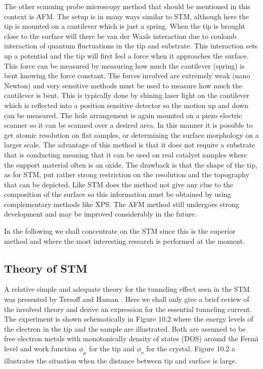 The other scanning probe microscopy method that should be mentioned in this context is AFM. The setup is in many ways similar to STM, although here the tip is mounted on a cantilever which is just a spring. When the tip is brought close to the surface will there be  van der Waals interaction due to coulomb interaction of quantum fluctuations in the tip and substrate. This interaction sets up a potential and the tip will first feel a force when it approaches the surface. This force can be measured by measuring how much the cantilever (spring) is bent knowing the force constant.  The forces involved are extremely weak (nano Newton) and very sensitive methods must be used to measure how much the cantilever is bent. This is typically done by shining laser light on the cantilever which is reflected into a position sensitive detector so the motion up and down can be measured. The hole arrangement is again mounted on a piezo electric scanner so it can be scanned over a desired area. In this manner it is possible to get atomic resolution on flat samples, or determining the  surface morphology on a larger scale. The advantage of this method is that it does not require a substrate that is conducting meaning that it can be used on real catalyst samples where the support material often is an oxide. The drawback is  that the shape of the tip, as for STM,  put rather strong restriction on the resolution  and the topography that can be depicted. Like STM  does the method not give any clue to the composition of the surface so this information must be obtained by using complementary methods like XPS. The AFM method still undergoes strong development and may be improved considerably  in the future.

In the following we shall concentrate on the STM since this is the superior method and where the most interesting research is performed at the moment.


\subsection{Theory of STM}

A relative simple and adequate theory for the tunneling effect seen in the STM was presented by Tersoff and Haman \cite{Tersoff}. Here we shall only give a brief review of the involved theory and derive an expression for the essential tunneling current. The experiment is shown schematically in Figure 10.2 where the energy levels of the electron in the tip and the sample are illustrated. Both are assumed to be free electron metals with monotonically density of states (DOS) around the Fermi level and work function $\phi_{\mu}$  for the tip and  $\phi_{\nu}$ for the crystal.  Figure 10.2 a illustrates the situation when the distance  between tip and surface is large. 

